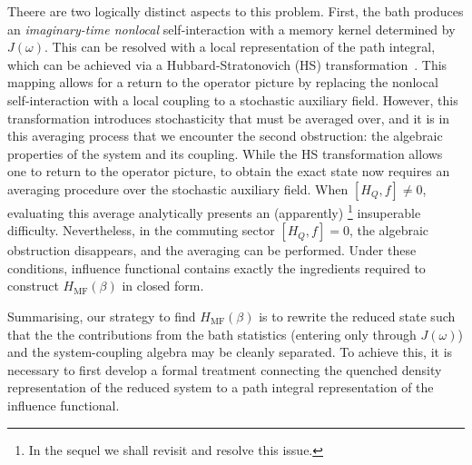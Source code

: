 Theere are two logically distinct aspects to this problem. First, the bath produces an \emph{imaginary-time nonlocal} self-interaction with a memory kernel determined by $J(\omega)$. This can be resolved with a local representation of the path integral, which can be achieved via a Hubbard-Stratonovich (HS) transformation~\cite{hubbardCalculationPartitionFunctions1959a, stratonovich1957QDistro}. This mapping allows for a return to the operator picture by replacing the nonlocal self-interaction with a local coupling to a stochastic auxiliary field. However, this transformation introduces stochasticity that must be averaged over, and it is in this averaging process that we encounter the second obstruction: the algebraic properties of the system and its coupling. While the HS transformation allows one to return to the operator picture, to obtain the exact state now requires an averaging procedure over the stochastic auxiliary field. When $[H_Q,f]\neq 0$, evaluating this average analytically presents an (apparently) \footnote{In the sequel we shall revisit and resolve this issue.} insuperable difficulty. Nevertheless, in the commuting sector $[H_Q,f]=0$, the algebraic obstruction disappears, and the averaging can be performed. Under these conditions, influence functional contains exactly the ingredients required to construct $H_{\mathrm{MF}}(\beta)$ in closed form.

Summarising, our strategy to find $H_{\mathrm{MF}}(\beta)$ is to rewrite the reduced state such that the the contributions from the bath statistics (entering only through $J(\omega)$) and the system-coupling algebra may be cleanly separated. To achieve this, it is necessary to first develop a formal treatment connecting the quenched density representation of the reduced system to a path integral representation of the influence functional. 


